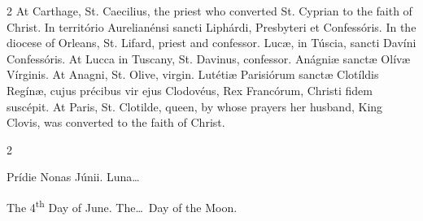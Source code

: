 \begin{paracol}{2}
At Carthage, St. Caecilius, the 
 priest who converted St. Cyprian to the faith of Christ.
\switchcolumn*
{}
In território 
 Aurelianénsi sancti Liphárdi, Presbyteri et Confessóris.
\switchcolumn
{}
In the diocese of Orleans, St. 
 Lifard, priest and confessor.
\switchcolumn*
{}
Lucæ, in Túscia, sancti 
 Davíni Confessóris.
\switchcolumn
{}
At Lucca in Tuscany, St. Davinus, 
 confessor.
\switchcolumn*
{}
Anágniæ sanctæ Olívæ 
 Vírginis.
\switchcolumn
{}
At Anagni, St. Olive, virgin.
\switchcolumn*
{}
Lutétiæ Parisiórum 
 sanctæ Clotíldis Regínæ, cujus précibus vir ejus Clodovéus, Rex Francórum, 
 Christi fidem suscépit.
\switchcolumn
{}
At Paris, St. Clotilde, queen, by 
 whose prayers her husband, King Clovis, was converted to the faith of 
 Christ.
\switchcolumn*
{}
\end{paracol}


\begin{paracol}{2}
\begin{center}{\color{gregoriocolor} Prídie Nonas Júnii. 
 Luna\dots\ }\end{center}
\switchcolumn
{}
\begin{center}{\color{gregoriocolor} The 4\textsuperscript{th} Day of 
 June. The\dots\ Day of the Moon.}\end{center}
\end{paracol}

